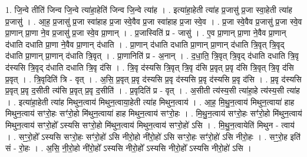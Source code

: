 \documentclass[17pt]{extarticle}
\begin{document}
1. जि॒न्वे तीति॑ जिन्व जि॒न्वे त्या॑हा॒हेति॑ जिन्व जि॒न्वे त्या॑ह । . इत्या॑हा॒हेती त्या॑ह प्र॒जासु॑ प्र॒जा स्वा॒हेती त्या॑ह प्र॒जासु॑ । . आ॒ह॒ प्र॒जासु॑ प्र॒जा स्वा॑हाह प्र॒जा स्वे॒वैव प्र॒जा स्वा॑हाह प्र॒जा स्वे॒व । . प्र॒जा स्वे॒वैव प्र॒जासु॑ प्र॒जा स्वे॒व प्रा॒णान् प्रा॒णा ने॒व प्र॒जासु॑ प्र॒जा स्वे॒व प्रा॒णान् । . प्र॒जास्विति॑ प्र - जासु॑ । . ए॒व प्रा॒णान् प्रा॒णा ने॒वैव प्रा॒णान् द॑धाति दधाति प्रा॒णा ने॒वैव प्रा॒णान् द॑धाति । . प्रा॒णान् द॑धाति दधाति प्रा॒णान् प्रा॒णान् द॑धाति त्रि॒वृत् त्रि॒वृद् द॑धाति प्रा॒णान् प्रा॒णान् द॑धाति त्रि॒वृत् । . प्रा॒णानिति॑ प्र - अ॒नान् । . द॒धा॒ति॒ त्रि॒वृत् त्रि॒वृद् द॑धाति दधाति त्रि॒वृ द॑स्यसि त्रि॒वृद् द॑धाति दधाति त्रि॒वृ द॑सि । . त्रि॒वृ द॑स्यसि त्रि॒वृत् त्रि॒वृ द॑सि प्र॒वृत् प्र॒वृ द॑सि त्रि॒वृत् त्रि॒वृ द॑सि प्र॒वृत् । . त्रि॒वृदिति॑ त्रि - वृत् । . अ॒सि॒ प्र॒वृत् प्र॒वृ द॑स्यसि प्र॒वृ द॑स्यसि प्र॒वृ द॑स्यसि प्र॒वृ द॑सि । . प्र॒वृ द॑स्यसि प्र॒वृत् प्र॒वृ द॒सीती त्य॑सि प्र॒वृत् प्र॒वृ द॒सीति॑ । . प्र॒वृदिति॑ प्र - वृत् । . अ॒सीती त्य॑स्य॒सी त्या॑हा॒हे त्य॑स्य॒सी त्या॑ह । . इत्या॑हा॒हेती त्या॑ह मिथुन॒त्वाय॑ मिथुन॒त्वाया॒हेती त्या॑ह मिथुन॒त्वाय॑ । . आ॒ह॒ मि॒थु॒न॒त्वाय॑ मिथुन॒त्वाया॑ हाह मिथुन॒त्वाय॑ सꣳरो॒हः सꣳ॑रो॒हो मि॑थुन॒त्वाया॑ हाह मिथुन॒त्वाय॑ सꣳरो॒हः । . मि॒थु॒न॒त्वाय॑ सꣳरो॒हः सꣳ॑रो॒हो मि॑थुन॒त्वाय॑ मिथुन॒त्वाय॑ सꣳरो॒हो᳚ ऽस्यसि सꣳरो॒हो मि॑थुन॒त्वाय॑ मिथुन॒त्वाय॑ सꣳरो॒हो॑ ऽसि । . मि॒थु॒न॒त्वायेति॑ मिथुन - त्वाय॑ । . सꣳ॒॒रो॒हो᳚ ऽस्यसि सꣳरो॒हः सꣳ॑रो॒हो॑ ऽसि नीरो॒हो नी॑रो॒हो॑ ऽसि सꣳरो॒हः सꣳ॑रो॒हो॑ ऽसि नीरो॒हः । . सꣳ॒॒रो॒ह इति॑ सं - रो॒हः । . अ॒सि॒ नी॒रो॒हो नी॑रो॒हो᳚ ऽस्यसि नीरो॒हो᳚ ऽस्यसि नीरो॒हो᳚ ऽस्यसि नीरो॒हो॑ ऽसि । \newline
\end{document}
